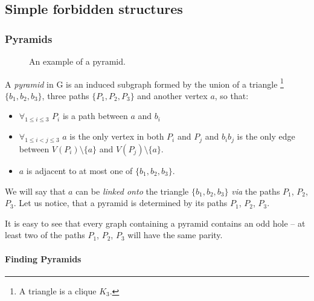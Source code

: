 \subsection{Simple forbidden structures}
\label{SimpleStructures}

\subsubsection{Pyramids}

\begin{wrapfigure}{r}{0.35\textwidth}
	
	\caption{An example  of a pyramid.}%
	\vspace{-1.2cm}
\end{wrapfigure}


A \emph{pyramid} in G is an induced subgraph formed by the union of a triangle \footnote{A triangle is a clique $K_3$.} $\{b_1,b_2,b_3\}$, three paths $\{P_1, P_2, P_3\}$ and another vertex $a$, so that:
\begin{itemize}
	\item $\forall_{1\leq i \leq 3}$ $P_i$ is a path between $a$ and $b_i$
	\item $\forall_{1\leq i < j \leq 3}$ $a$ is the only vertex in both $P_i$ and $P_j$ and $b_ib_j$ is the only edge between $V(P_i)\setminus\{a\}$ and $V(P_j)\setminus\{a\}$.
	\item $a$ is adjacent to at most one of $\{b_1, b_2, b_3\}$.
\end{itemize}

We will say that $a$ can be \emph{linked onto} the triangle $\{b_1, b_2, b_3\}$ \emph{via} the paths $P_1$, $P_2$, $P_3$. Let us notice, that a pyramid is determined by its paths $P_1$, $P_2$, $P_3$.

It is easy to see that every graph containing a pyramid contains an odd hole -- at least two of the paths $P_1$, $P_2$, $P_3$ will have the same parity.

\paragraph{Finding Pyramids}

